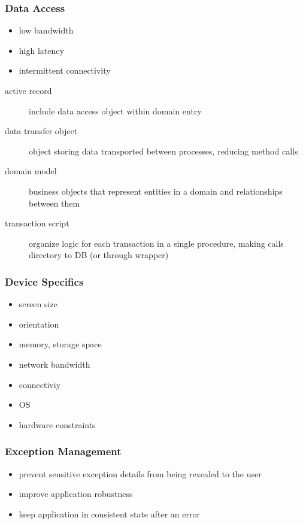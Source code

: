 \documentclass[]{article}
\theoremstyle{definition}
\begin{document}
	\subsubsection{Data Access}
	\begin{itemize}
		\item low bandwidth
		\item high latency
		\item intermittent connectivity
	\end{itemize}
	\begin{description}
		\item[active record] include data access object within domain entry
		\item[data transfer object] object storing data transported between processes, reducing method calls
		\item[domain model] business objects that represent entities in a domain and relationships between them
		\item[transaction script] organize logic for each transaction in a single procedure, making calls directory to DB (or through wrapper)
	\end{description}

	\subsubsection{Device Specifics}
	\begin{itemize}
		\item screen size
		\item orientation
		\item memory, storage space
		\item network bandwidth
		\item connectiviy
		\item OS
		\item hardware constraints
	\end{itemize}

	\subsubsection{Exception Management}
	\begin{itemize}
		\item prevent sensitive exception details from being revealed to the user
		\item improve application robustness
		\item keep application in consistent state after an error
	\end{itemize}
\end{document}
